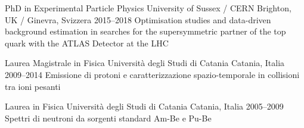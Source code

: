 






\begin{cventries}

  \cventry
      {PhD in Experimental Particle Physics}
      {University of Sussex / CERN}
      {Brighton, UK / Ginevra, Svizzera}
      {2015--2018}
      {Optimisation studies and data-driven background estimation in searches for the 
      supersymmetric partner of the top quark with the ATLAS Detector at the LHC}

  \cventry
      {Laurea Magistrale in Fisica}
      {Università degli Studi di Catania}
      {Catania, Italia}
      {2009--2014}
      {Emissione di protoni e caratterizzazione spazio-temporale in collisioni tra ioni pesanti}
      
  \cventry
      {Laurea in Fisica}
      {Università degli Studi di Catania}
      {Catania, Italia}
      {2005--2009}
      {Spettri di neutroni da sorgenti standard Am-Be e Pu-Be}
\end{cventries}
